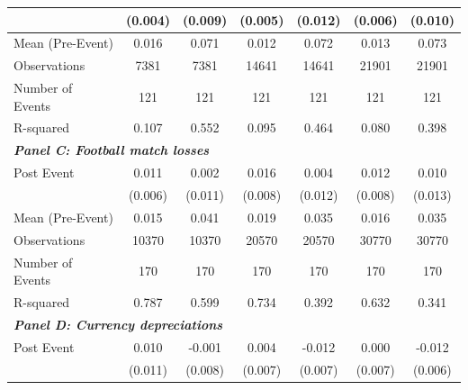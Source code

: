 {\begin{tabular}{l*{6}{c}}
&     (0.004)         &     (0.009)         &     (0.005)         &     (0.012)         &     (0.006)         &     (0.010)         \\
\midrule
Mean (Pre-Event)&       0.016         &       0.071         &       0.012         &       0.072         &       0.013         &       0.073         \\
Observations&        7381         &        7381         &       14641         &       14641         &       21901         &       21901         \\
Number of Events&         121         &         121         &         121         &         121         &         121         &         121         \\
R-squared   &       0.107         &       0.552         &       0.095         &       0.464         &       0.080         &       0.398         \\
\bottomrule
\multicolumn{7}{l}{\textbf{\textit{Panel C: Football match losses}}} \\
Post Event  &       0.011\sym{*}  &       0.002         &       0.016\sym{**} &       0.004         &       0.012         &       0.010         \\
&     (0.006)         &     (0.011)         &     (0.008)         &     (0.012)         &     (0.008)         &     (0.013)         \\
\midrule
Mean (Pre-Event)&       0.015         &       0.041         &       0.019         &       0.035         &       0.016         &       0.035         \\
Observations&       10370         &       10370         &       20570         &       20570         &       30770         &       30770         \\
Number of Events&         170         &         170         &         170         &         170         &         170         &         170         \\
R-squared   &       0.787         &       0.599         &       0.734         &       0.392         &       0.632         &       0.341         \\
\bottomrule
\multicolumn{7}{l}{\textbf{\textit{Panel D: Currency depreciations}}} \\
Post Event  &       0.010         &      -0.001         &       0.004         &      -0.012\sym{*}  &       0.000         &      -0.012\sym{*}  \\
&     (0.011)         &     (0.008)         &     (0.007)         &     (0.007)         &     (0.007)         &     (0.006)         \\

\end{tabular}}
